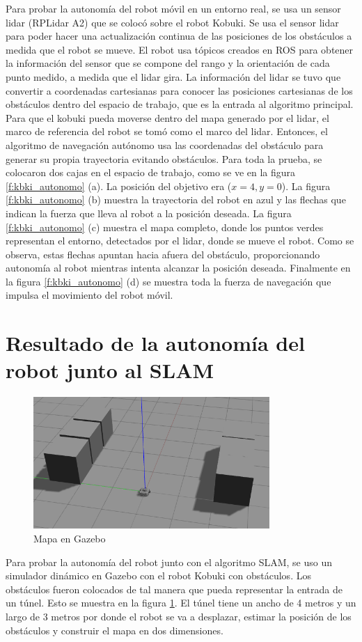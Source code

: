 Para probar la autonomía del robot móvil en un entorno real, se usa un sensor lidar 
(RPLidar A2) que se colocó sobre el robot Kobuki. Se usa el sensor lidar para poder 
hacer una actualización continua de las posiciones de los obstáculos a medida que el 
robot se mueve. El robot usa tópicos creados en ROS para obtener la información del 
sensor que se compone del rango y la orientación de cada punto medido, a medida que 
el lidar gira. La información del lidar se tuvo que convertir a coordenadas cartesianas 
para conocer las posiciones cartesianas de los obstáculos dentro del espacio de trabajo, 
que es la entrada al algoritmo principal. Para que el kobuki pueda moverse dentro del 
mapa generado por el lidar, el marco de referencia del robot se tomó como el marco del 
lidar. Entonces, el algoritmo de navegación autónomo usa las coordenadas del obstáculo 
para generar su propia trayectoria evitando obstáculos. Para toda la prueba, se colocaron 
dos cajas en el espacio de trabajo, como se ve en la figura \ref{f:kbki_autonomo} (a). La 
posición del objetivo era ($x = 4, y = 0$). La figura \ref{f:kbki_autonomo} (b) muestra 
la trayectoria del robot en azul y las flechas que indican la fuerza que lleva al robot a la 
posición deseada. La figura \ref{f:kbki_autonomo} (c) muestra el mapa completo, donde los 
puntos verdes representan el entorno, detectados por el lidar, donde se mueve el robot. Como 
se observa, estas flechas apuntan hacia afuera del obstáculo, proporcionando autonomía al 
robot mientras intenta alcanzar la posición deseada. Finalmente en la figura 
\ref{f:kbki_autonomo} (d) se muestra toda la fuerza de navegación que impulsa el movimiento 
del robot móvil.

\section{Resultado de la autonomía del robot junto al SLAM}
\begin{figure}%
  \centering \footnotesize
  \includegraphics[width=0.80\textwidth]{images/gazebo_map.png}
  \captionsetup{font=footnotesize}
  \caption{Mapa en Gazebo}
  \label{fig:Gazebo_simu}
\end{figure}
Para probar la autonomía del robot junto con el algoritmo SLAM, se uso un simulador dinámico 
en Gazebo con el robot Kobuki con obstáculos. Los obstáculos fueron colocados de tal manera
que pueda representar la entrada de un túnel. Esto se muestra en la figura 
\ref{fig:Gazebo_simu}. El túnel tiene un ancho de 4 metros y un largo de 3 metros por donde 
el robot se va a desplazar, estimar la posición de los obstáculos y construir el mapa en dos 
dimensiones.

